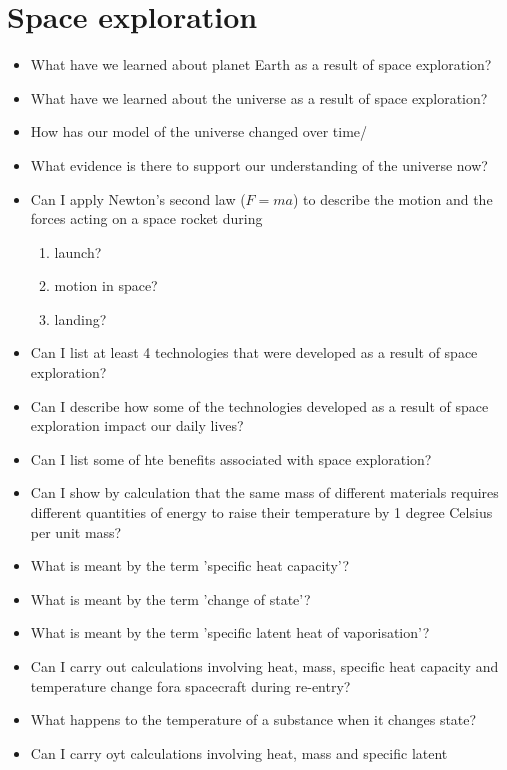 \section{Space exploration}
\begin{multicols}{2}
	\begin{itemize}
		\item What have we learned about planet Earth as a result of space exploration?
		\item What have we learned about the universe as a result of space exploration?
		\item How has our model of the universe changed over time/
		\item What evidence is there to support our understanding of the universe now?
		\item Can I apply Newton's second law ($F = ma$) to describe the motion and
			the forces acting on a space rocket during
			\begin{enumerate}[label=(\alph*)]
				\item launch?
				\item motion in space?
				\item landing?
			\end{enumerate}
		\item Can I list at least 4 technologies that were developed as a result of
			space exploration?
		\item Can I describe how some of the technologies developed as a result of 
			space exploration impact our daily lives?
		\item Can I list some of hte benefits associated with space exploration?
		\item Can I show by calculation that the same mass of different materials
			requires different quantities of energy to raise their temperature
			by 1 degree Celsius per unit mass?
		\item What is meant by the term 'specific heat capacity'?
		\item What is meant by the term 'change of state'?
		\item What is meant by the term 'specific latent heat of vaporisation'?
		\item Can I carry out calculations involving heat, mass, specific heat
			capacity and temperature change fora spacecraft during re-entry?
		\item What happens to the temperature of a substance when it changes state?
		\item Can I carry oyt calculations involving heat, mass and specific latent

\end{itemize}
\end{multicols}
